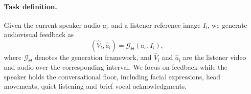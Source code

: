 \label{sec:task}
\paragraph{Task definition.}
Given the current speaker audio
$a_s$ and a listener reference
image $I_l$, we generate audiovisual
feedback as
\begin{equation}
    (\widehat V_l,\widehat a_l)
    = \mathcal{G}_{\Theta}(a_s,I_l),
    \label{eq:task}
\end{equation}
where $\mathcal{G}_{\Theta}$ denotes
the generation framework,
and $\widehat V_l$ and $\widehat
a_l$ are the listener video
and audio over the corresponding
interval.
We focus on feedback while the
speaker holds the conversational
floor, including facial expressions,
head movements, quiet
listening and brief
vocal acknowledgments.